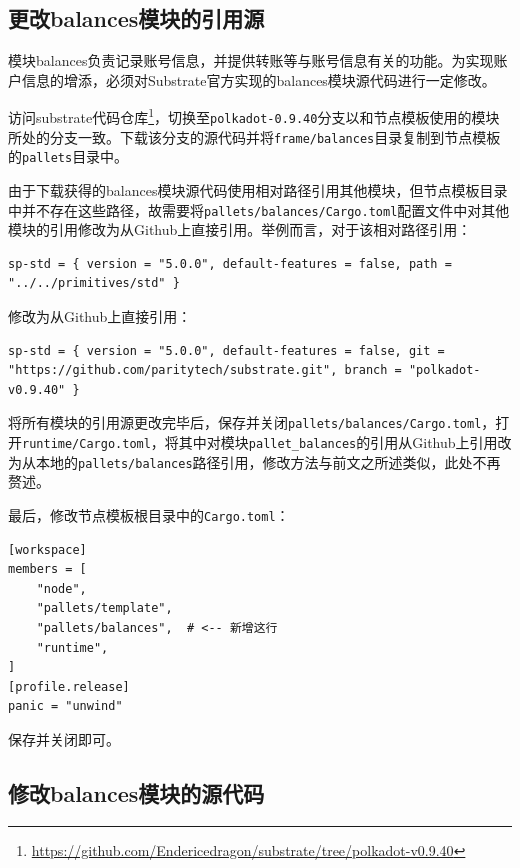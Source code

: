 \subsection{更改balances模块的引用源}

模块balances负责记录账号信息，并提供转账等与账号信息有关的功能。为实现账户信息的增添，必须对Substrate官方实现的balances模块源代码进行一定修改。

访问substrate代码仓库\footnote{\url{https://github.com/Endericedragon/substrate/tree/polkadot-v0.9.40}}，切换至\verb|polkadot-0.9.40|分支以和节点模板使用的模块所处的分支一致。下载该分支的源代码并将\verb|frame/balances|目录复制到节点模板的\verb|pallets|目录中。

由于下载获得的balances模块源代码使用相对路径引用其他模块，但节点模板目录中并不存在这些路径，故需要将\verb|pallets/balances/Cargo.toml|配置文件中对其他模块的引用修改为从Github上直接引用。举例而言，对于该相对路径引用：

\begin{lstlisting}
sp-std = { version = "5.0.0", default-features = false, path = "../../primitives/std" }

\end{lstlisting}

修改为从Github上直接引用：

\begin{lstlisting}
sp-std = { version = "5.0.0", default-features = false, git = "https://github.com/paritytech/substrate.git", branch = "polkadot-v0.9.40" }
\end{lstlisting}

将所有模块的引用源更改完毕后，保存并关闭\verb|pallets/balances/Cargo.toml|，打开\verb|runtime/Cargo.toml|，将其中对模块\verb|pallet_balances|的引用从Github上引用改为从本地的\verb|pallets/balances|路径引用，修改方法与前文之所述类似，此处不再赘述。

最后，修改节点模板根目录中的\verb|Cargo.toml|：

\begin{lstlisting}
[workspace]
members = [
    "node",
    "pallets/template",
    "pallets/balances",  # <-- 新增这行
    "runtime",
]
[profile.release]
panic = "unwind"
\end{lstlisting}

保存并关闭即可。

\subsection{修改balances模块的源代码}

